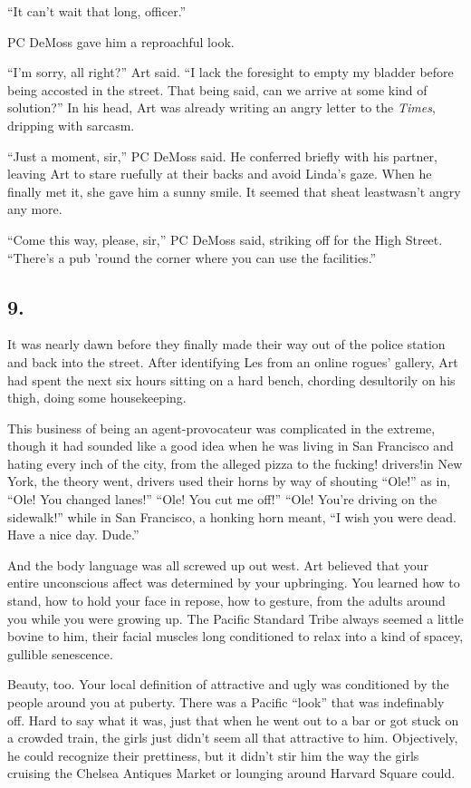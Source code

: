 “It can’t wait that long, officer.”

PC DeMoss gave him a reproachful look.

“I’m sorry, all right?” Art said. “I lack the foresight to empty my
bladder before being accosted in the street. That being said, can
we arrive at some kind of solution?” In his head, Art was already
writing an angry letter to the \emph{Times}, dripping with
sarcasm.

“Just a moment, sir,” PC DeMoss said. He conferred briefly with his
partner, leaving Art to stare ruefully at their backs and avoid
Linda’s gaze. When he finally met it, she gave him a sunny smile.
It seemed that she{\dash}at least{\dash}wasn’t angry any more.

“Come this way, please, sir,” PC DeMoss said, striking off for the
High Street. “There’s a pub ’round the corner where you can use the
facilities.”

\subsection{9.}

It was nearly dawn before they finally made their way out of the
police station and back into the street. After identifying Les from
an online rogues’ gallery, Art had spent the next six hours sitting
on a hard bench, chording desultorily on his thigh, doing some
housekeeping.

This business of being an agent-provocateur was complicated in the
extreme, though it had sounded like a good idea when he was living
in San Francisco and hating every inch of the city, from the
alleged pizza to the fucking! drivers!{\dash}in New York, the theory
went, drivers used their horns by way of shouting “Ole!” as in,
“Ole! You changed lanes!” “Ole! You cut me off!” “Ole! You’re
driving on the sidewalk!” while in San Francisco, a honking horn
meant, “I wish you were dead. Have a nice day. Dude.”

And the body language was all screwed up out west. Art believed
that your entire unconscious affect was determined by your
upbringing. You learned how to stand, how to hold your face in
repose, how to gesture, from the adults around you while you were
growing up. The Pacific Standard Tribe always seemed a little
bovine to him, their facial muscles long conditioned to relax into
a kind of spacey, gullible senescence.

Beauty, too. Your local definition of attractive and ugly was
conditioned by the people around you at puberty. There was a
Pacific “look” that was indefinably off. Hard to say what it was,
just that when he went out to a bar or got stuck on a crowded
train, the girls just didn’t seem all that attractive to him.
Objectively, he could recognize their prettiness, but it didn’t
stir him the way the girls cruising the Chelsea Antiques Market or
lounging around Harvard Square could.

